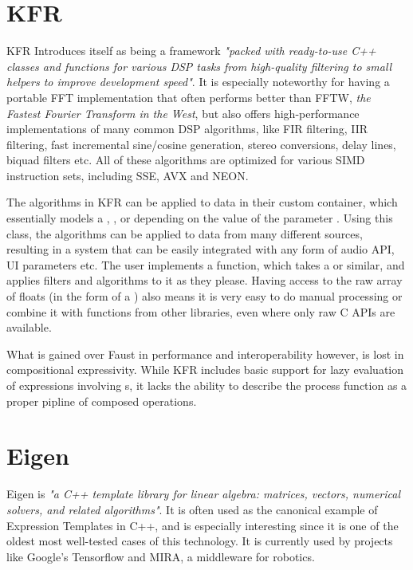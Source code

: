 \section{KFR}

KFR Introduces itself as being a framework \emph{"packed with ready-to-use C++ classes and functions for various DSP tasks from high-quality filtering to
  small helpers to improve development speed"}\autocite{kfrwebsite}. It is especially
noteworthy for having a portable FFT implementation that often performs better than FFTW,
\emph{the Fastest Fourier Transform in the West}\autocite{FFTW05}, but also offers high-performance implementations of many common
DSP algorithms, like FIR filtering, IIR filtering, fast incremental sine/cosine generation, stereo
conversions, delay lines, biquad filters etc\autocite{kfrwebsite}. All of these algorithms are optimized for
various SIMD instruction sets, including SSE, AVX and NEON.

The algorithms in KFR can be applied to data in their custom  container, which essentially models a ,
, or  depending on the value of the parameter . Using this class, the algorithms can be applied to data from many different sources, resulting in a system that can be easily integrated with any form of audio API, UI parameters etc. The user implements a 
function, which takes a  or similar, and applies filters and algorithms to it as they please. Having access to the raw array of floats (in the form of a ) also means it is very easy to do manual processing
or combine it with functions from other libraries, even where only raw C APIs are available.

What is gained over Faust in performance and interoperability however, is lost in compositional expressivity.
While KFR includes basic support for lazy evaluation of expressions involving s, it
lacks the ability to describe the process function as a proper pipline of composed operations.

\section{Eigen}

Eigen is \emph{"a C++ template library for linear algebra: matrices, vectors, numerical solvers, and related algorithms"}\autocite{eigenweb}. It is often used as the canonical example of
Expression Templates in C++, and is especially interesting since it is one of the oldest most well-tested
cases of this technology. It is currently used by projects like Google's Tensorflow\autocite{tensorflow2015-whitepaper} and
MIRA, a middleware for robotics\autocite{Einhorn2012-bx}.

